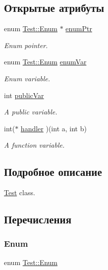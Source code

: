 \subsection*{Открытые атрибуты}
\begin{DoxyCompactItemize}
\item 
enum \hyperlink{class_test_add48b50526c27bcdb96b828ddfaaf648}{Test\+::\+Enum} $\ast$ \hyperlink{class_test_aa227d847bbcc907bde488c4389458fb5}{enum\+Ptr}
\begin{DoxyCompactList}\small\item\em Enum pointer. \end{DoxyCompactList}\item 
enum \hyperlink{class_test_add48b50526c27bcdb96b828ddfaaf648}{Test\+::\+Enum} \hyperlink{class_test_acddf2c0544e1b3d1475142eb28589b2c}{enum\+Var}
\begin{DoxyCompactList}\small\item\em Enum variable. \end{DoxyCompactList}\item 
int \hyperlink{class_test_a3085f973ef857d85d647bf04e89760d0}{public\+Var}
\begin{DoxyCompactList}\small\item\em A public variable. \end{DoxyCompactList}\item 
int($\ast$ \hyperlink{class_test_ad596b3dbeefd2b62620ee18c8d06cece}{handler} )(int a, int b)
\begin{DoxyCompactList}\small\item\em A function variable. \end{DoxyCompactList}\end{DoxyCompactItemize}


\subsection{Подробное описание}
\hyperlink{class_test}{Test} class. 

\subsection{Перечисления}
\hypertarget{class_test_add48b50526c27bcdb96b828ddfaaf648}{}\label{class_test_add48b50526c27bcdb96b828ddfaaf648} 
\subsubsection{\texorpdfstring{Enum}{Enum}}
{\footnotesize\ttfamily enum \hyperlink{class_test_add48b50526c27bcdb96b828ddfaaf648}{Test\+::\+Enum}}



